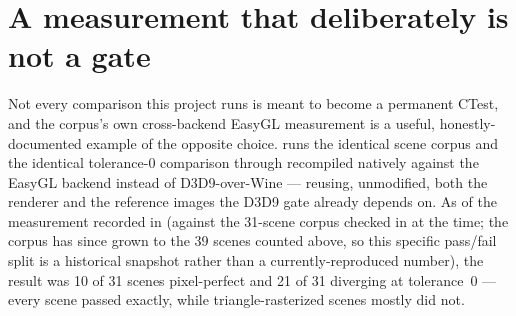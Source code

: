 \section{A measurement that deliberately is not a gate}

Not every comparison this project runs is meant to become a permanent CTest, and the corpus's
own cross-backend EasyGL measurement is a useful, honestly-documented example of the opposite
choice.  runs the identical scene corpus and
the identical tolerance-0  comparison through
 recompiled natively against the EasyGL backend
instead of D3D9-over-Wine --- reusing, unmodified, both the renderer and the reference images the
D3D9 gate already depends on. As of the measurement recorded in
 (against the 31-scene corpus checked in at the time; the
corpus has since grown to the 39 scenes counted above, so this specific pass/fail split is a
historical snapshot rather than a currently-reproduced number), the result was 10 of 31 scenes
pixel-perfect and 21 of 31 diverging at tolerance~0 --- every  scene passed
exactly, while triangle-rasterized scenes mostly did not.

